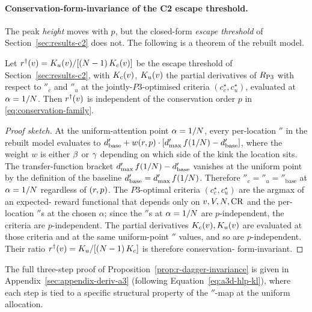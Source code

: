 \paragraph{Conservation-form-invariance of the C2 escape threshold.}
The peak \emph{height} moves with $p$, but the closed-form
\emph{escape threshold} of Section~\ref{sec:results-c2} does not. The
following is a theorem of the rebuilt model.

\begin{proposition}
\label{prop:r-dagger-invariance}
Let $r^{\dagger}(v) = K_u(v)/[(N - 1)\,K_c(v)]$ be the
escape threshold of Section~\ref{sec:results-c2}, with $K_c(v)$,
$K_u(v)$ the partial derivatives of $R_{\mathrm{P3}}$ with respect to
$\dprime_c$ and $\dprime_u$ at the jointly-$P3$-optimised criteria
$(c_c^\star, c_u^\star)$, evaluated at $\alpha = 1/N$. Then
$r^{\dagger}(v)$ is independent of the conservation order $p$ in
\eqref{eq:conservation-family}.
\end{proposition}

\begin{proof}[Proof sketch]
At the uniform-attention point $\alpha = 1/N$, every per-location
$\dprime$ in the rebuilt model evaluates to
$d'_{\mathrm{base}} + w(r, p)\cdot[d'_{\max} \,f(1/N) -
d'_{\mathrm{base}}]$, where the weight $w$ is either $\beta$
or $\gamma$ depending on which side of the kink the location sits.
The transfer-function bracket $d'_{\max} \,f(1/N) -
d'_{\mathrm{base}}$ vanishes at the uniform point by the
definition of the baseline $d'_{\mathrm{base}} = d'_{\max}\,
f(1/N)$. Therefore $\dprime_c = \dprime_u = \dprime_{\mathrm{base}}$
at $\alpha = 1/N$ regardless of $(r, p)$. The $P3$-optimal
criteria $(c_c^\star, c_u^\star)$ are the argmax of an expected-
reward functional that depends only on $v, V, N, \mathrm{CR}$
and the per-location $\dprime$s at the chosen $\alpha$; since the
$\dprime$s at $\alpha = 1/N$ are $p$-independent, the criteria
are $p$-independent. The partial derivatives $K_c(v), K_u(v)$
are evaluated at those criteria and at the same uniform-point
$\dprime$ values, and so are $p$-independent. Their ratio
$r^{\dagger}(v) = K_u/[(N - 1)\,K_c]$ is therefore conservation-
form-invariant.
\end{proof}

The full three-step proof of
Proposition~\ref{prop:r-dagger-invariance} is given in
Appendix~\ref{sec:appendix-deriv-a3} (following
Equation~\eqref{eq:a3d-hlp-kl}), where each step is tied to a
specific structural property of the $\dprime$-map at the uniform
allocation.

